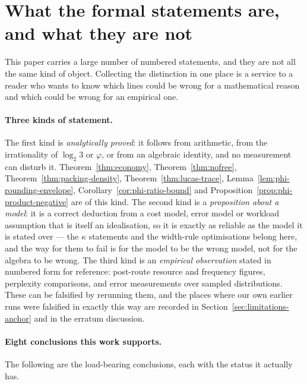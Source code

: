 \documentclass[11pt]{article}
\theoremstyle{definition}
\begin{document}
\section{What the formal statements are, and what they are
not}\label{sec:statusofstatements}

This paper carries a large number of numbered statements, and they are not all the
same kind of object. Collecting the distinction in one place is a service to a
reader who wants to know which lines could be wrong for a mathematical reason and
which could be wrong for an empirical one.

\paragraph{Three kinds of statement.} The first kind is \emph{analytically
proved}: it follows from arithmetic, from the irrationality of $\log_2 3$ or
$\varphi$, or from an algebraic identity, and no measurement can disturb it.
Theorem~\ref{thm:economy}, Theorem~\ref{thm:nofree},
Theorem~\ref{thm:packing-density}, Theorem~\ref{thm:lucas-trace},
Lemma~\ref{lem:phi-rounding-envelope}, Corollary~\ref{cor:phi-ratio-bound} and
Proposition~\ref{prop:phi-product-negative} are of this kind. The second kind is a
\emph{proposition about a model}: it is a correct deduction from a cost model,
error model or workload assumption that is itself an idealisation, so it is exactly
as reliable as the model it is stated over --- the $\kappa$ statements and the
width-rule optimisations belong here, and the way for them to fail is for the
model to be the wrong model, not for the algebra to be wrong. The third kind is an
\emph{empirical observation} stated in numbered form for reference: post-route
resource and frequency figures, perplexity comparisons, and error measurements
over sampled distributions. These can be falsified by rerunning them, and the
places where our own earlier runs were falsified in exactly this way are recorded
in Section~\ref{sec:limitations-anchor} and in the erratum discussion.

\paragraph{Eight conclusions this work supports.} The following are the load-bearing
conclusions, each with the status it actually has.
\end{document}
